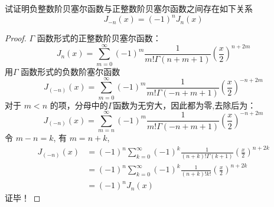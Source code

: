 \begin{example}
	试证明负整数阶贝塞尔函数与正整数阶贝塞尔函数之间存在如下关系
	\begin{equation*}
		J_{-n}(x)=(-1)^n J_n(x)
	\end{equation*}	
\end{example}
 \begin{proof}
	$\Gamma$ 函数形式的正整数阶贝塞尔函数：
	\begin{equation*}
		J_n(x) = \sum\limits_{m=0}^{\infty} (-1)^m  \frac{1}{m! \Gamma(n+m+1) } (\frac{x}{2})^{n+2m} 
	\end{equation*}	
	用$\Gamma$ 函数形式的负数阶塞尔函数
	\begin{equation*}
		J_{(-n)}(x) = \sum\limits_{m=0}^{\infty} (-1)^m  \frac{1}{m! \Gamma(-n+m+1) } (\frac{x}{2})^{-n+2m} 
	\end{equation*}	
	对于 $m<n$ 的项，分母中的$\Gamma$函数为无穷大，因此都为零,去除后为：
	\begin{equation*}
		J_{(-n)}(x) = \sum\limits_{m=n}^{\infty} (-1)^m  \frac{1}{m! \Gamma(-n+m+1) } (\frac{x}{2})^{-n+2m} 
	\end{equation*}	
	令 $m-n=k$, 有 $m=n+k $, 
	\begin{equation*}
	\begin{aligned}
		J_{(-n)}(x) &= (-1)^n\sum\limits_{k=0}^{\infty} (-1)^k  \frac{1}{(n+k)! \Gamma(k+1) } (\frac{x}{2})^{n+2k}  \\
		&= (-1)^n\sum\limits_{k=0}^{\infty} (-1)^k  \frac{1}{(n+k)! k! } (\frac{x}{2})^{n+2k} \\
		&=(-1)^n J_{n} (x)
	\end{aligned}
	\end{equation*}	
	证毕！
 \end{proof}
 ~~\\ 

